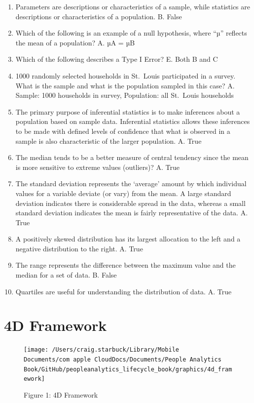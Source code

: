 \documentclass[]{book}
\begin{document}
\begin{enumerate}
\def\labelenumi{\arabic{enumi}.}
\item
  Parameters are descriptions or characteristics of a sample, while statistics are descriptions or characteristics of a population.
  B. False
\item
  Which of the following is an example of a null hypothesis, where ``µ'' reflects the mean of a population?
  A. µA = µB
\item
  Which of the following describes a Type I Error?
  E. Both B and C
\item
  1000 randomly selected households in St.~Louis participated in a survey. What is the sample and what is the population sampled in this case?
  A. Sample: 1000 households in survey, Population: all St.~Louis households
\item
  The primary purpose of inferential statistics is to make inferences about a population based on sample data. Inferential statistics allows these inferences to be made with defined levels of confidence that what is observed in a sample is also characteristic of the larger population.
  A. True
\item
  The median tends to be a better measure of central tendency since the mean is more sensitive to extreme values (outliers)?
  A. True
\item
  The standard deviation represents the `average' amount by which individual values for a variable deviate (or vary) from the mean. A large standard deviation indicates there is considerable spread in the data, whereas a small standard deviation indicates the mean is fairly representative of the data.
  A. True
\item
  A positively skewed distribution has its largest allocation to the left and a negative distribution to the right.
  A. True
\item
  The range represents the difference between the maximum value and the median for a set of data.
  B. False
\item
  Quartiles are useful for understanding the distribution of data.
  A. True
\end{enumerate}

\hypertarget{d-framework-1}{%
\section{4D Framework}\label{d-framework-1}}

\begin{figure}
\texttt{[image: /Users/craig.starbuck/Library/Mobile Documents/com~apple~CloudDocs/Documents/People Analytics Book/GitHub/peopleanalytics\_lifecycle\_book/graphics/4d\_framework]} \caption{Figure 1: 4D Framework}\label{fig:unnamed-chunk-23}
\end{figure}
\end{document}
